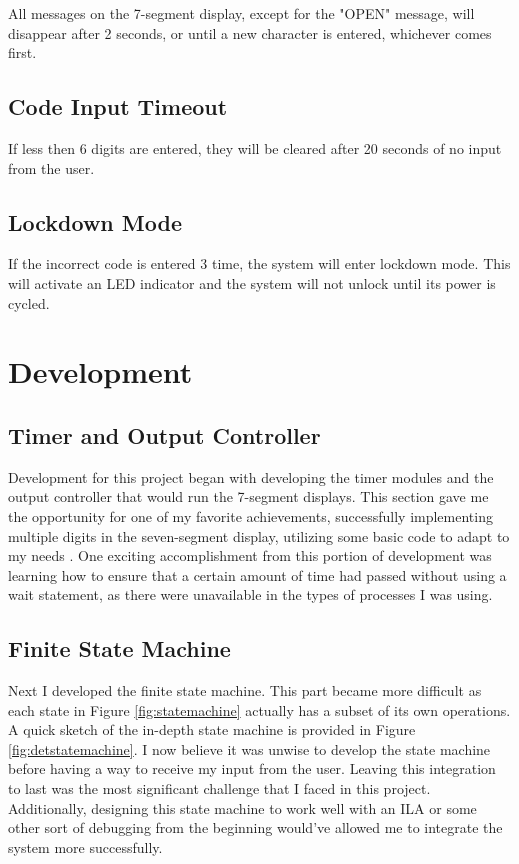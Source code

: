 \documentclass[11pt]{article}
\begin{document}
All messages on the 7-segment display, except for the "OPEN" message, will disappear after 2 seconds, or until a new character is entered, whichever comes first.

\subsection{Code Input Timeout}

If less then 6 digits are entered, they will be cleared after 20 seconds of no input from the user.

\subsection{Lockdown Mode}

If the incorrect code is entered 3 time, the system will enter lockdown mode. This will activate an LED indicator and the system will not unlock until its power is cycled.

\section{Development}

\subsection{Timer and Output Controller}

Development for this project began with developing the timer modules and the output  controller that would run the 7-segment displays. This section gave me the opportunity for one of my favorite achievements, successfully implementing multiple digits in the seven-segment display, utilizing some basic code to adapt to my needs \cite{sevseg}. One exciting accomplishment from this portion of development was learning how to ensure that a certain amount of time had passed without using a wait statement, as there were unavailable in the types of processes I was using.

\subsection{Finite State Machine}

Next I developed the finite state machine. This part became more difficult as each state in Figure \ref{fig:statemachine} actually has a subset of its own operations. A quick sketch of the in-depth state machine is provided in Figure \ref{fig:detstatemachine}. I now believe it was unwise to develop the state machine before having a way to receive my input from the user. Leaving this integration to last was the most significant challenge that I faced in this project. Additionally, designing this state machine to work well with an ILA or some other sort of debugging from the beginning would've allowed me to integrate the system more successfully.
\end{document}
